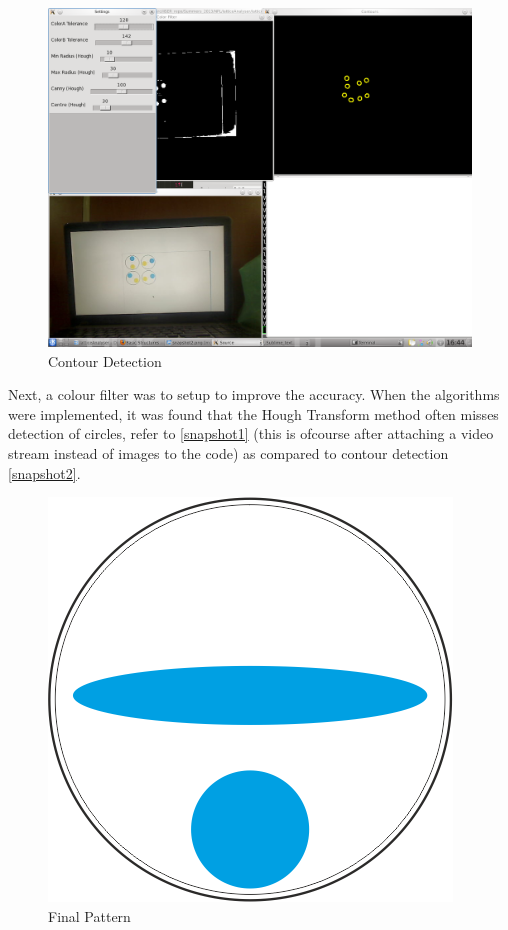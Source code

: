 		\begin{figure}[bth]
			\begin{center}
				\includegraphics[width=1.1\linewidth]{../../latticeAnalyser/snapshot2.png}
			\end{center}
		\caption[Contour Detection]{Contour Detection}
		\label{snapshot2}
		\end{figure}

		Next, a colour filter was to setup to improve the accuracy. When the algorithms were implemented, it was found that the Hough Transform method often misses detection of circles, refer to \autoref{snapshot1} (this is ofcourse after attaching a video stream instead of images to the code) as compared to contour detection \autoref{snapshot2}.
		\par

		\begin{figure}[bth]
			\begin{center}
				\includegraphics[width=0.3\linewidth]{../../latticeAnalyser/singleDipole.png}
			\end{center}
		\caption[Final Pattern]{Final Pattern}
		\label{singleDipole}
		\end{figure}

